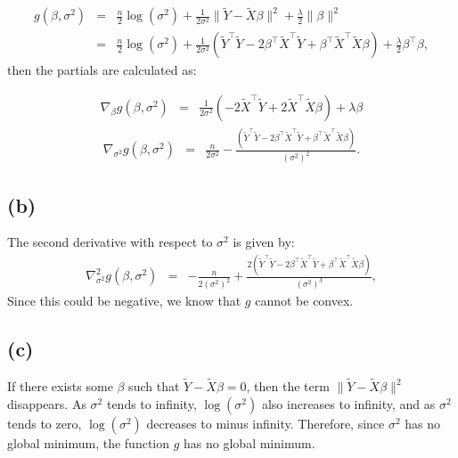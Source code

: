 \documentclass{article}\usepackage[]{graphicx}\usepackage[]{color}
\begin{document}
\begin{eqnarray*}
  g(\beta,\sigma^2) &=& \frac{n}{2}\log(\sigma^2) + \frac{1}{2\sigma^2}\|\tilde{Y}-\tilde{X}\beta\|^2 + \frac{\lambda}{2}\|\beta\|^2 \\
        &=& \frac{n}{2}\log(\sigma^2) + \frac{1}{2\sigma^2}(\tilde{Y}^\top\tilde{Y}-2\beta^\top\tilde{X}^\top\tilde{Y} + \beta^\top\tilde{X}^\top\tilde{X}\beta) + \frac{\lambda}{2}\beta^\top\beta,
\end{eqnarray*}
then the partials are calculated as:

\begin{eqnarray*}
  \nabla_\beta g(\beta,\sigma^2) &=& \frac{1}{2\sigma^2}\left( -2\tilde{X}^\top\tilde{Y} + 2\tilde{X}^\top\tilde{X}\beta \right) + \lambda\beta
\end{eqnarray*}
\begin{eqnarray*}
  \nabla_{\sigma^2} g(\beta,\sigma^2) &=& \frac{n}{2\sigma^2} - \frac{(\tilde{Y}^\top\tilde{Y} - 2\beta^\top\tilde{X}^\top\tilde{Y} + \beta^\top\tilde{X}^\top\tilde{X}\beta)}{(\sigma^2)^2}.
\end{eqnarray*}

\subsection*{(b)}
The second derivative with respect to $\sigma^2$ is given by:
\begin{eqnarray*}
  \nabla_{\sigma^2}^2 g(\beta,\sigma^2) &=& -\frac{n}{2(\sigma^2)^2} + \frac{2(\tilde{Y}^\top\tilde{Y} - 2\beta^\top\tilde{X}^\top\tilde{Y} + \beta^\top\tilde{X}^\top\tilde{X}\beta)}{(\sigma^2)^3},
\end{eqnarray*}
Since this could be negative, we know that $g$ cannot be convex.

\subsection*{(c)}
If there exists some $\beta$ such that $\tilde{Y}-\tilde{X}\beta=0$, then the term $\|\tilde{Y}-\tilde{X}\beta\|^2$ disappears.  As $\sigma^2$ tends to infinity, $\log(\sigma^2)$ also increases to infinity, and as $\sigma^2$ tends to zero, $\log(\sigma^2)$ decreases to minus infinity.  Therefore, since $\sigma^2$ has no global minimum, the function $g$ has no global minimum.
\end{document}
